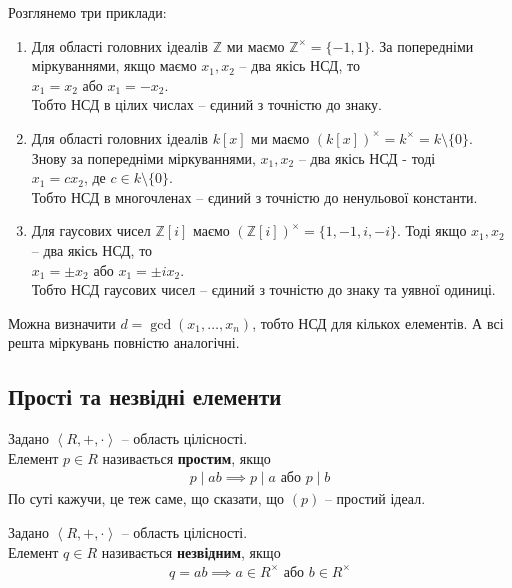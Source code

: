 \documentclass{math_library}
\begin{document}
\begin{example} Розглянемо три приклади:
\begin{enumerate}[wide=0pt,label={\arabic*.}]
\item Для області головних ідеалів $\mathbb{Z}$ ми маємо $\mathbb{Z}^\times = \{-1,1\}$. За попередніми міркуваннями, якщо маємо $x_1,x_2$ -- два якісь НСД, то\\
$x_1 = x_2$ або $x_1 = -x_2$.\\
Тобто НСД в цілих числах -- єдиний з точністю до знаку.
\item Для області головних ідеалів $k[x]$ ми маємо $(k[x])^\times = k^\times = k \setminus \{0\}$. Знову за попередніми міркуваннями, $x_1,x_2$ -- два якісь НСД - тоді\\
$x_1 = c x_2$, де $c \in k \setminus \{0\}$.\\
Тобто НСД в многочленах -- єдиний з точністю до ненульової константи.
\item Для гаусових чисел $\mathbb{Z}[i]$ маємо $(\mathbb{Z}[i])^\times = \{1,-1,i,-i\}$. Тоді якщо $x_1,x_2$ -- два якісь НСД, то\\
$x_1 = \pm x_2$ або $x_1 = \pm ix_2$.\\
Тобто НСД гаусових чисел -- єдиний з точністю до знаку та уявної одиниці.
\end{enumerate}
\end{example}

\begin{remark}
Можна визначити $d = \gcd(x_1,\dots,x_n)$, тобто НСД для кількох елементів. А всі решта міркувань повністю аналогічні.
\end{remark}

\subsection{Прості та незвідні елементи}
\begin{definition}
Задано $\left< R,+,\cdot \right>$ -- область цілісності.\\
Елемент $p \in R$ називається \textbf{простим}, якщо
\begin{align*}
p \mid ab \implies p \mid a \text{ або } p \mid b
\end{align*}
По суті кажучи, це теж саме, що сказати, що $(p)$ -- простий ідеал.
\end{definition}

\begin{definition}
Задано $\left< R,+,\cdot \right>$ -- область цілісності.\\
Елемент $q \in R$ називається \textbf{незвідним}, якщо
\begin{align*}
q = ab \implies a \in R^\times \text{ або } b \in R^\times
\end{align*}
\end{definition}
\end{document}
